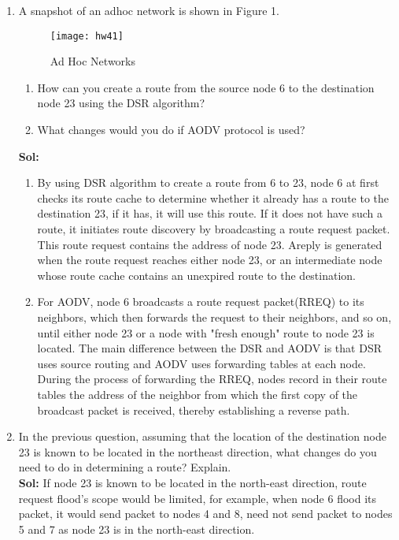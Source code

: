 \documentclass[11pt]{article}
\begin{document}
\begin{enumerate}
\item A snapshot of an adhoc network is shown in Figure 1.
\begin{figure}
\begin{center}
\texttt{[image: hw41]}\\
\caption{Ad Hoc Networks}
\end{center}
\end{figure}
	\begin{enumerate}
	\item How can you create a route from the source node 6 to the destination node 23 using the DSR algorithm?
	\item What changes would you do if AODV protocol is used?
	\end{enumerate}
\textbf{Sol:}
	\begin{enumerate}
	\item By using DSR algorithm to create a route from 6 to 23, node 6 at first checks its route cache to determine whether it already has a route to the destination 23, if it has, it will use this route. If it does not have such a route, it initiates route discovery by broadcasting a route request packet. This route request contains the address of node 23. Areply is generated when the route request reaches either node 23, or an intermediate node whose route cache contains an unexpired route to the destination.
	\item For AODV, node 6 broadcasts a route request packet(RREQ) to its neighbors, which then forwards the request to their neighbors, and so on, until either node 23 or a node with "fresh enough" route to node 23 is located. The main difference between the DSR and AODV is that DSR uses source routing and AODV uses forwarding tables at each node. During the process of forwarding the RREQ, nodes record in their route tables the address of the neighbor from which the first copy of the broadcast packet is received, thereby establishing a reverse path.
	\end{enumerate}
	
\item In the previous question, assuming that the location of the destination node 23 is known to be located in the northeast direction, what changes do you need to do in determining a route? Explain.\\
\textbf{Sol:} If node 23 is known to be located in the north-east direction, route request flood's scope would be limited, for example, when node 6 flood its packet, it would send packet to nodes 4 and 8, need not send packet to nodes 5 and 7 as node 23 is in the north-east direction.


\end{enumerate}
\end{document}
